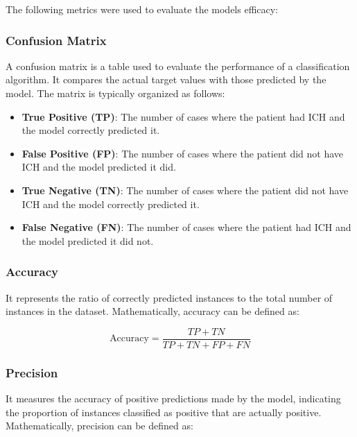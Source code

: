 The following metrics were used to evaluate the models efficacy:

\subsubsection{Confusion Matrix}

A confusion matrix is a table used to evaluate the performance of a classification algorithm. It compares the actual target values with those predicted by the model. The matrix is typically organized as follows:

\begin{itemize}
    \item \textbf{True Positive (TP)}: The number of cases where the patient had ICH and the model correctly predicted it.
    \item \textbf{False Positive (FP)}: The number of cases where the patient did not have ICH and the model predicted it did.
    \item \textbf{True Negative (TN)}: The number of cases where the patient did not have ICH and the model correctly predicted it.
    \item \textbf{False Negative (FN)}: The number of cases where the patient had ICH and the model predicted it did not.
\end{itemize}


\subsubsection{Accuracy}
It represents the ratio of correctly predicted instances to the total number of instances in the dataset. Mathematically, accuracy can be defined as:

\begin{equation*}
    \text{Accuracy} = \frac{TP + TN}{TP + TN + FP + FN}
\end{equation*}

\subsubsection{Precision}
It measures the accuracy of positive predictions made by the model, indicating the proportion of instances classified as positive that are actually positive. Mathematically, precision can be defined as:

